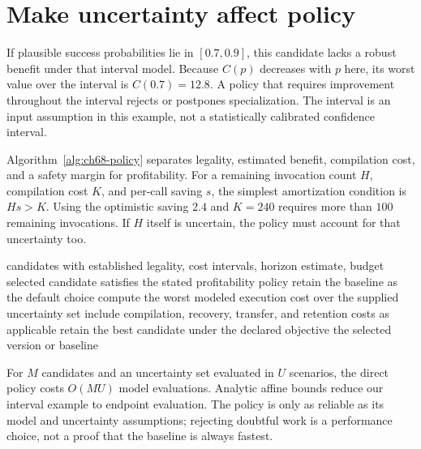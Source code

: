 \section{Make uncertainty affect policy}
\label{sec:ch68-uncertainty}

If plausible success probabilities lie in $[0.7,0.9]$, this candidate lacks a robust benefit under that interval model.
Because $C(p)$ decreases with $p$ here, its worst value over the interval is $C(0.7)=12.8$.
A policy that requires improvement throughout the interval rejects or postpones specialization.
The interval is an input assumption in this example, not a statistically calibrated confidence interval.

Algorithm~\ref{alg:ch68-policy} separates legality, estimated benefit, compilation cost, and a safety margin for profitability.
For a remaining invocation count $H$, compilation cost $K$, and per-call saving $s$, the simplest amortization condition is $Hs>K$.
Using the optimistic saving $2.4$ and $K=240$ requires more than $100$ remaining invocations.
If $H$ itself is uncertain, the policy must account for that uncertainty too.

\begin{algorithm}[htbp]
\caption{Choose a specialization using a conservative finite candidate model.}
\label{alg:ch68-policy}
\begin{pseudocode}
\Require candidates with established legality, cost intervals, horizon estimate, budget
\Ensure selected candidate satisfies the stated profitability policy
\State retain the baseline as the default choice
  \State compute the worst modeled execution cost over the supplied uncertainty set
  \State include compilation, recovery, transfer, and retention costs as applicable
    \State retain the best candidate under the declared objective
  \EndIf
\EndFor
\State \Return the selected version or baseline
\end{pseudocode}
\end{algorithm}

For $M$ candidates and an uncertainty set evaluated in $U$ scenarios, the direct policy costs $O(MU)$ model evaluations.
Analytic affine bounds reduce our interval example to endpoint evaluation.
The policy is only as reliable as its model and uncertainty assumptions; rejecting doubtful work is a performance choice, not a proof that the baseline is always fastest.

